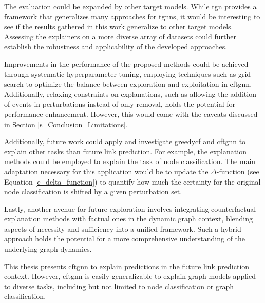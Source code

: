 The evaluation could be expanded by other target models. While \gls{tgn} provides a framework that generalizes many approaches for \glspl{tgnn}, it would be interesting to see if the results gathered in this work generalize to other target models. Assessing the explainers on a more diverse array of datasets could further establish the robustness and applicability of the developed approaches.

Improvements in the performance of the proposed methods could be achieved through systematic hyperparameter tuning, employing techniques such as grid search to optimize the balance between exploration and exploitation in \gls{cftgnn}. 
Additionally, relaxing constraints on explanations, such as allowing the addition of events in perturbations instead of only removal, holds the potential for performance enhancement. However, this would come with the caveats discussed in Section \ref{s_Conclusion_Limitations}.

Additionally, future work could apply and investigate \gls{greedycf} and \gls{cftgnn} to explain other tasks than future link prediction. For example, the explanation methods could be employed to explain the task of node classification. The main adaptation necessary for this application would be to update the $\Delta$-function (see Equation \ref{e_delta_function}) to quantify how much the certainty for the original node classification is shifted by a given perturbation set.


Lastly, another avenue for future exploration involves integrating counterfactual explanation methods with factual ones in the dynamic graph context, blending aspects of necessity and sufficiency into a unified framework. Such a hybrid approach holds the potential for a more comprehensive understanding of the underlying graph dynamics.




\iffalse
This thesis presents \gls{cftgnn} to explain predictions in the future link prediction context. However, \gls{cftgnn} is easily generalizable to explain graph models applied to diverse tasks, including but not limited to node classification or graph classification.

